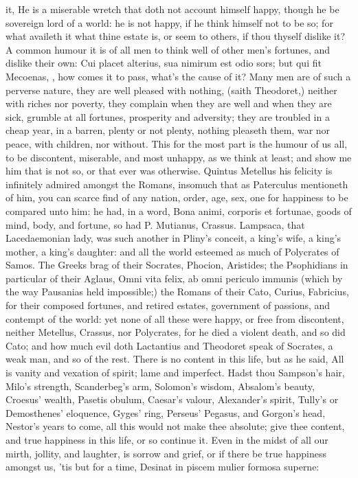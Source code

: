 {it, He is a miserable wretch that doth not account himself happy,
though he be sovereign lord of a world: he is not happy, if he think
himself not to be so; for what availeth it what thine estate is, or
seem to others, if thou thyself dislike it? A common humour it is of
all men to think well of other men's fortunes, and dislike their own:
Cui placet alterius, sua nimirum est odio sors; but qui fit
Mecoenas, \etc{}, how comes it to pass, what's the cause of it? Many men
are of such a perverse nature, they are well pleased with nothing,
(saith  Theodoret,) neither with riches nor poverty, they
complain when they are well and when they are sick, grumble at all
fortunes, prosperity and adversity; they are troubled in a cheap year,
in a barren, plenty or not plenty, nothing pleaseth them, war nor
peace, with children, nor without. This for the most part is the humour
of us all, to be discontent, miserable, and most unhappy, as we think
at least; and show me him that is not so, or that ever was otherwise.
Quintus Metellus his felicity is infinitely admired amongst the Romans,
insomuch that as Paterculus mentioneth of him, you can scarce
find of any nation, order, age, sex, one for happiness to be compared
unto him: he had, in a word, Bona animi, corporis et fortunae, goods of
mind, body, and fortune, so had P. Mutianus, Crassus. Lampsaca,
that Lacedaemonian lady, was such another in Pliny's conceit, a
king's wife, a king's mother, a king's daughter: and all the world
esteemed as much of Polycrates of Samos. The Greeks brag of their
Socrates, Phocion, Aristides; the Psophidians in particular of their
Aglaus, Omni vita felix, ab omni periculo immunis (which by the way
Pausanias held impossible;) the Romans of their  Cato, Curius,
Fabricius, for their composed fortunes, and retired estates, government
of passions, and contempt of the world: yet none of all these were
happy, or free from discontent, neither Metellus, Crassus, nor
Polycrates, for he died a violent death, and so did Cato; and how much
evil doth Lactantius and Theodoret speak of Socrates, a weak man, and
so of the rest. There is no content in this life, but as he said,
All is vanity and vexation of spirit; lame and imperfect. Hadst thou
Sampson's hair, Milo's strength, Scanderbeg's arm, Solomon's wisdom,
Absalom's beauty, Croesus' wealth, Pasetis obulum, Caesar's valour,
Alexander's spirit, Tully's or Demosthenes' eloquence, Gyges' ring,
Perseus' Pegasus, and Gorgon's head, Nestor's years to come, all this
would not make thee absolute; give thee content, and true happiness in
this life, or so continue it. Even in the midst of all our mirth,
jollity, and laughter, is sorrow and grief, or if there be true
happiness amongst us, 'tis but for a time,
Desinat in piscem mulier formosa superne:

}
